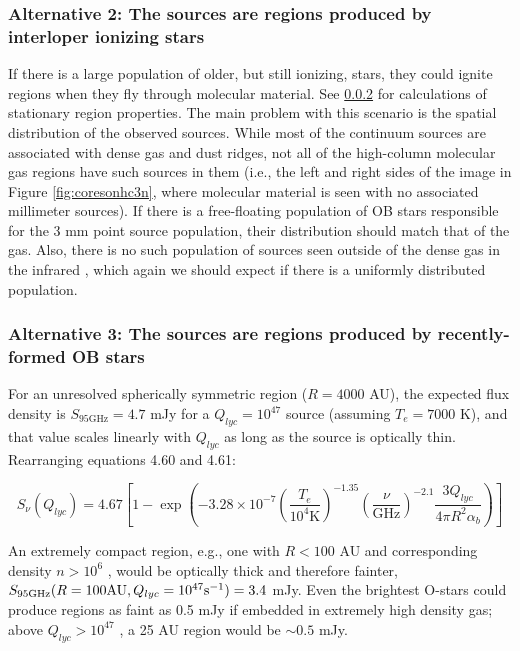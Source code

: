 \documentclass{emulateapj}
\begin{document}
\subsubsection{Alternative 2: The sources are \hii regions produced by interloper ionizing stars}
If there is a large population of older, but still ionizing, stars, they could
ignite \hii regions when they fly through molecular material.  See
\ref{sec:theyarehiiregions} for calculations of stationary \hii region
properties.  The main problem with this scenario is the spatial distribution of
the observed sources.  While most of the continuum sources are associated with
dense gas and dust ridges, not all of the high-column molecular gas regions
have such sources in them (i.e., the left and right sides of the image in
Figure \ref{fig:coresonhc3n}, where molecular material is seen with no
associated millimeter sources).  If there is a free-floating population of OB
stars responsible for the 3 mm point source population, their distribution
should match that of the gas.  Also, there is no such population of sources
seen outside of the dense gas in the infrared \citep[TODO: Who has done
infrared studies of Sgr B2?  You can infer what I have stated `by inspection'
of 2MASS, but it would be more straightforward to quote someone else][]{},
which again we should
expect if there is a uniformly distributed population.  

\subsubsection{Alternative 3: The sources are \hii regions produced by recently-formed OB stars}
\label{sec:theyarehiiregions}

For an unresolved spherically symmetric \hii region ($R=4000$ AU), the expected
flux density is $S_{95 \mathrm{GHz}} = 4.7$ mJy for a $Q_{lyc}=10^{47}$ \pers
source (assuming $T_e=7000$ K), and that value scales linearly with $Q_{lyc}$
as long as the source is optically thin.  Rearranging \citet{Condon2007a} equations
4.60 and 4.61:

\begin{equation}
S_{\nu}(Q_{lyc})  = 4.67 \left[1-\exp\left(-3.28\times10^{-7} \left(\frac{T_e}{10^4 \mathrm{K}}\right)^{-1.35} \left(\frac{\nu}{\mathrm{GHz}}\right)^{-2.1} \frac{3 Q_{lyc}}{4 \pi R^2 \alpha_b} \right) \right]
\end{equation}

An extremely compact \hii region,
e.g., one with $R<100$ AU and corresponding density $n>10^6$ \percc, would be
optically thick and therefore fainter, $S_{95 \mathrm{GHz}}(R=100 \mathrm{AU},
Q_{lyc}=10^{47} \mathrm{s}^{-1})=3.4$ mJy.  Even the brightest O-stars could produce \hii
regions as faint as 0.5 mJy if embedded in extremely high density gas; above
$Q_{lyc}>10^{47}$ \pers, a 25 AU \hii region would be $\sim0.5$ mJy.
\end{document}
